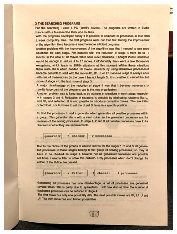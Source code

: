 \documentclass{report}
\begin{document}
\begin{appendices}
\begin{figure}[H]
\begin{subfigure}[b]{0.45\textwidth}
				\includegraphics[width=\textwidth]{Resources/Images/appKloosterman3.jpg}
			\end{subfigure}
			\hspace{5mm}
			\begin{subfigure}[b]{0.45\textwidth}

\end{subfigure}
\end{figure}
\end{appendices}
\end{document}
